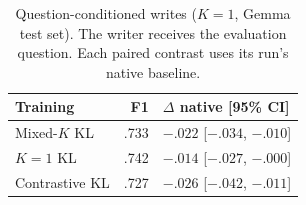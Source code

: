 \begin{table}[t]
\centering
\caption{Question-conditioned writes ($K=1$, Gemma test set).
The writer receives the evaluation question. Each paired contrast uses
its run's native baseline.}
\label{tab:conditioned}
\small\setlength{\tabcolsep}{3pt}
\begin{tabular}{@{}lrl@{}}
\toprule
Training & F1 & $\Delta$ native [95\% CI] \\
\midrule
Mixed-$K$ KL & .733 & $-.022$ [$-.034$, $-.010$] \\
$K=1$ KL & .742 & $-.014$ [$-.027$, $-.000$] \\
Contrastive KL & .727 & $-.026$ [$-.042$, $-.011$] \\
\bottomrule
\end{tabular}
\end{table}
